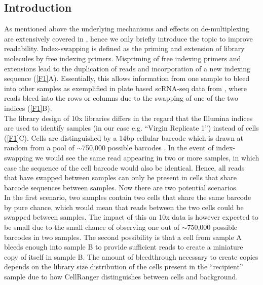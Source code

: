 \documentclass{article}
\begin{document}
\subsection*{Introduction}
As mentioned above the underlying mechanisms and effects on de-multiplexing are extensively covered in \autocite{Sinha2017}, hence we only briefly introduce the topic to improve readability.
Index-swapping is defined as the priming and extension of library molecules by free indexing primers.
Mispriming of free indexing primers and extensions lead to the duplication of reads and incorporation of a new indexing sequence (\autoref{F1}A).
Essentially, this allows information from one sample to bleed into other samples as exemplified in plate based scRNA-seq data from \autocite{Sinha2017}, where reads bleed into the rows or columns due to the swapping of one of the two indices (\autoref{F1}B).\\
The library design of 10x libraries differs in the regard that the Illumina indices are used to identify samples (in our case e.g. ``Virgin Replicate 1'') instead of cells (\autoref{F1}C).
Cells are distinguished by a 14bp cellular barcode which is drawn at random from a pool of $\sim$750,000 possible barcodes \autocite{Zheng2017}.
In the event of index-swapping we would see the same read appearing in two or more samples, in which case the sequence of the cell barcode would also be identical.
Hence, all reads that have swapped between samples can only be present in cells that share barcode sequences between samples.
Now there are two potential scenarios.\\
In the first scenario, two samples contain two cells that share the same barcode by pure chance, which would mean that reads between the two cells could be swapped between samples.
The impact of this on 10x data is however expected to be small due to the small chance of observing one out of $\sim$750,000 possible barcodes in two samples.
The second possibility is that a cell from sample A bleeds enough into sample B to provide sufficient reads to create a miniature copy of itself in sample B.
The amount of bleedthrough necessary to create copies depends on the library size distribution of the cells present in the ``recipient'' sample due to how CellRanger distinguishes between cells and background.
\end{document}

